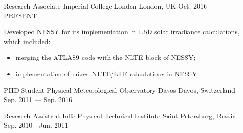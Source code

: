 

\begin{cventries}

  \cventry
    {Research Associate} %
    {Imperial College London} %
    {London, UK} %
    {Oct. 2016 --- PRESENT} %
    {
      \begin{cvitems} %
        \item {Developed NESSY for its implementation in 1.5D solar irradiance calculations, which included:}
            \begin{itemize}
                \item {merging the ATLAS9 code with the NLTE block of NESSY;}
                \item {implementation of mixed NLTE/LTE calculations in NESSY.}
            \end{itemize}
      \end{cvitems}
    }

  \cventry
    {PHD Student} %
    {Physical Meteorological Observatory Davos} %
    {Davos, Switzerland} %
    {Sep. 2011 --- Sep. 2016} %
    {
      \begin{cvitems} %
        \item {}
        \item {}
        \item {}
      \end{cvitems}
    }

  \cventry
    {Research Assistant} %
    {Ioffe Physical-Technical Institute} %
    {Saint-Petersburg, Russia} %
    {Sep. 2010 - Jun. 2011} %
    {
      \begin{cvitems} %
        \item {}
        \item {}
        \item {}
      \end{cvitems}
    }

\end{cventries}
